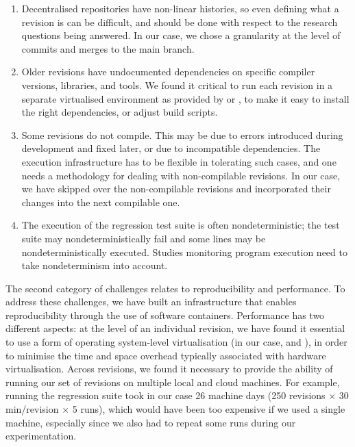 \begin{enumerate}
\item Decentralised repositories have non-linear histories, so even
  defining what a revision is can be difficult, and should be done
  with respect to the research questions being answered.  In our case,
  we chose a granularity at the level of commits and merges to the
  main branch.

\item Older revisions have undocumented dependencies on specific
  compiler versions, libraries, and tools.  We found it critical to run each
  revision in a separate virtualised environment as provided by \lxc or
  \docker, to make it easy to install the right dependencies, or adjust build
  scripts.

\item Some revisions do not compile.  This may be due to errors
  introduced during development and fixed later, or due to incompatible
  dependencies. The execution infrastructure has to be
  flexible in tolerating such cases, and one needs a methodology for
  dealing with non-compilable revisions.  In our case, we have skipped
  over the non-compilable revisions and incorporated their changes into
  the next compilable one.

\item The execution of the regression test suite is often
  nondeterministic; the test suite may nondeterministically fail
  and some lines may be nondeterministically executed. Studies
  monitoring program execution need to take nondeterminism
  into account.
\end{enumerate}

The second category of challenges relates to reproducibility and performance.
To address these challenges, we have built an infrastructure that enables
reproducibility through the use of software containers. Performance has two
different aspects: at the level of an individual revision, we have found it
essential to use a form of operating system-level virtualisation (in our case,
\lxc and \docker), in order to minimise the time and space overhead typically
associated with hardware virtualisation.  Across revisions, we found it
necessary to provide the ability of running our set of revisions on multiple
local and cloud machines. For example, running the \git regression suite took
in our case 26 machine days (250 revisions $\times$ 30 min/revision $\times$ 5
runs), which would have been too expensive if we used a single machine,
especially since we also had to repeat some runs during our experimentation.
